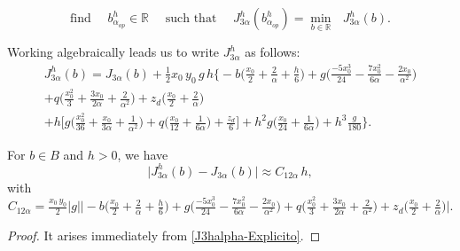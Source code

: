 \documentclass[axioms,article,submit,moreauthors]{Definitions/mdpi}
\begin{document}
\[ \text{find }\quad {b^h_{\alpha_{op}}}\in \mathbb{R}\quad\text{ such that }\quad
{J^h_{3\alpha}}({b^h_{\alpha_{op}}})=\min\limits_{b\in \mathbb{R}} \text{ }{J^h_{3\alpha}}(b).
\]

Working algebraically leads us to write ${J^h_{3\alpha}}$ as follows:
  \begin{equation}\label{J3halpha-Explicito}
  \begin{array}{ll}
 { J^h_{3\alpha}}(b)= J_{3\alpha}(b) + \tfrac{1}{2} x_0\,y_0 \,g \,h \Big \{- b \Big(  \tfrac{x_0}{2} + \tfrac{2}{\alpha}  + \tfrac{h}{6}\Big)
  + g \Big( \tfrac{-5 x_0^3}{24} -  \tfrac{7 x_0^2}{6 \alpha} -  \tfrac{2 x_0}{\alpha^2} \Big)\\[0.45cm]
  + q \Big(  \tfrac{x_0^2}{3} +  \tfrac{3 x_0}{2 \alpha} +  \tfrac{2}{\alpha^2}\Big) + z_d \Big(  \tfrac{x_0}{2} +  \tfrac{2}{\alpha}\Big) \\[0.45cm]
  + h \Big[ g \Big(  \tfrac{x_0^2}{36} +  \tfrac{x_0}{3 \alpha} +  \tfrac{1}{\alpha^2}\Big) + q \Big(  \tfrac{x_0}{12} + \tfrac{1}{6 \alpha}\Big) + \tfrac{z_d}{6} \Big]
 + h^2 g \Big(  \tfrac{x_0}{24} +  \tfrac{1}{6 \alpha}\Big) + h^3 \tfrac{g}{180} \Big\}.
 \end{array}
 \end{equation}
        
  \vspace{.4cm}

  \begin{Lemma} For $b\in B$ and $h>0$, we have
\begin{equation}    \label{J3halpha-J3alpha}
 \lvert  { J^h_{3\alpha}}(b) - J_{3\alpha}(b) \rvert  \approx C_{12\alpha} \, h ,
\end{equation}
with \[C_{12\alpha}=\tfrac{x_0\,y_0}{2}  |g|  \Big\lvert- b \Big(  \tfrac{x_0}{2} + \tfrac{2}{\alpha}  + \tfrac{h}{6}\Big)
  + g \Big( \tfrac{-5 x_0^3}{24} -  \tfrac{7 x_0^2}{6 \alpha} -  \tfrac{2 x_0}{\alpha^2} \Big)
  + q \Big(  \tfrac{x_0^2}{3} +  \tfrac{3 x_0}{2 \alpha} +  \tfrac{2}{\alpha^2}\Big) + z_d \Big(  \tfrac{x_0}{2} +  \tfrac{2}{\alpha}\Big)\Big\rvert.\]
  \end{Lemma}
  \begin{proof}
  It arises immediately from \eqref{J3halpha-Explicito}.
  \end{proof}
  
\end{document}
